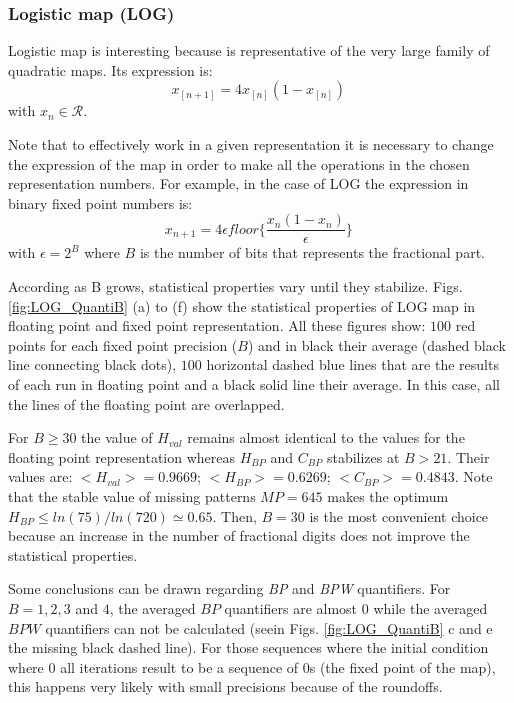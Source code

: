\subsubsection{Logistic map (LOG)} \label{subsubsec:log}

Logistic map is interesting because is representative of the very large family of quadratic maps.
Its expression is:
\begin{equation}\label{eq:logimap}
 x_{[n+1]}=4x_{[n]}(1-x_{[n]}) \,
\end{equation}
with $x_n\in\mathcal{R}$.

Note that to effectively work in a given representation it is necessary to change the expression of the map in order to make all the operations in the chosen representation numbers. For example, in the case of LOG the expression in binary fixed point numbers is:
\begin{equation}\label{eq:logimapB2}
x_{n+1}=4 \epsilon floor\{\frac{x_n(1-x_n)}{\epsilon}\} \,
\end{equation}
with $\epsilon = 2^B$ where $B$ is the number of bits that represents the fractional part.

According as B grows, statistical properties vary until they stabilize.
Figs. \ref{fig:LOG_QuantiB} (a) to (f) show the statistical properties of LOG map in floating point and fixed point representation.
All these figures show: $100$ red points for each fixed point precision ($B$) and in black their average (dashed black line connecting black dots), $100$ horizontal dashed blue lines that are the results of each run in floating point and a black solid line their average.
In this case, all the lines of the floating point are overlapped.

For $B\geq 30$ the value of $H_{val}$ remains almost identical to the values for the floating point representation whereas $H_{BP}$ and $C_{BP}$ stabilizes at $B>21$.
Their values are: $<H_{val}>=0.9669$; $<H_{BP}>=0.6269$; $<C_{BP}>=0.4843$.
Note that the stable value of missing patterns $MP=645$ makes the optimum $H_{BP} \leq ln(75)/ln(720) \simeq 0.65$.
Then, $B=30$ is the most convenient choice because an increase in the number of fractional digits does not improve the statistical properties.

Some conclusions can be drawn regarding \textit{BP} and \textit{BPW} quantifiers.
For $B=1, 2, 3$ and $4$, the averaged $BP$ quantifiers are almost $0$ while the averaged $BPW$ quantifiers can not be calculated (seein Figs. \ref{fig:LOG_QuantiB} c and e the missing black dashed line).
For those sequences where the initial condition where $0$ all iterations result to be a sequence of $0$s (the fixed point of the map), this happens very likely with small precisions because of the roundoffs.

